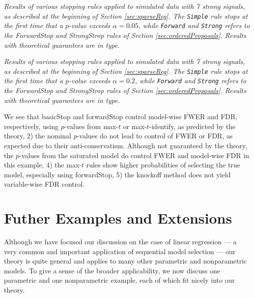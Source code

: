 \documentclass{article}
\begin{document}
\begin{table}[ht]
\centering

\caption[tab:stopping]{\em Results of various stopping rules applied to simulated data with 7 strong signals,  as described at the beginning of Section \ref{sec:sparseReg}.
The {\tt Simple} rule stops at the first time that a $p$-value exceeds $\alpha=0.05$, while {\tt Forward} and {\tt Strong} refers to the ForwardStop and StrongStrop rules of Section \ref{sec:orderedProposals}. Results with theoretical guarantees are in  type.}
\label{tab:stopping05}
\end{table}

\begin{table}[ht]
\centering

\caption[tab:stopping]{\em Results of various stopping rules applied to simulated data with 7 strong signals,  as described at the beginning of Section \ref{sec:sparseReg}.
The {\tt Simple} rule stops at the first time that a $p$-value exceeds $\alpha=0.2$, while {\tt Forward} and {\tt Strong} refers to the ForwardStop and StrongStrop rules of Section \ref{sec:orderedProposals}. Results with theoretical guarantees are in  type.}
\label{tab:stopping20}
\end{table}

We see that basicStop and forwardStop control model-wise FWER and FDR, respectively, using $p$-values from max-$t$ or max-$t$-identify, as predicted by the theory, 2) the nominal $p$-values do not lead to control of FWER or FDR, as expected due to their anti-conservatism. Although not guaranteed by the theory, the $p$-values from the saturated model do control FWER and model-wise FDR in this example, 4) the max-$t$ rules show higher probabilities of selecting the true model, especially using forwardStop, 5) the knockoff method does not yield variable-wise FDR control.


\section{Futher Examples and Extensions}

Although we have focused our discussion on the case of linear regression --- a very common and important application of sequential model selection --- our theory is quite general and applies to many other parametric and nonparametric models. To give a sense of the broader applicability, we now discuss one parametric and one nonparametric example, each of which fit nicely into our theory.
\end{document}
